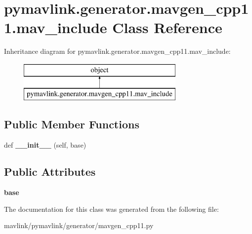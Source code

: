 \hypertarget{classpymavlink_1_1generator_1_1mavgen__cpp11_1_1mav__include}{}\section{pymavlink.\+generator.\+mavgen\+\_\+cpp11.\+mav\+\_\+include Class Reference}
\label{classpymavlink_1_1generator_1_1mavgen__cpp11_1_1mav__include}
Inheritance diagram for pymavlink.\+generator.\+mavgen\+\_\+cpp11.\+mav\+\_\+include\+:\begin{figure}[H]
\begin{center}
\leavevmode
\includegraphics[height=2.000000cm]{classpymavlink_1_1generator_1_1mavgen__cpp11_1_1mav__include}
\end{center}
\end{figure}
\subsection*{Public Member Functions}
\begin{DoxyCompactItemize}
\item 
\mbox{\label{classpymavlink_1_1generator_1_1mavgen__cpp11_1_1mav__include_a927802c78d2a11518f56ec6db923dd70}} 
def {\bfseries \+\_\+\+\_\+init\+\_\+\+\_\+} (self, base)
\end{DoxyCompactItemize}
\subsection*{Public Attributes}
\begin{DoxyCompactItemize}
\item 
\mbox{\label{classpymavlink_1_1generator_1_1mavgen__cpp11_1_1mav__include_ad3e828d0783a3571238a55aef8b94160}} 
{\bfseries base}
\end{DoxyCompactItemize}


The documentation for this class was generated from the following file\+:\begin{DoxyCompactItemize}
\item 
mavlink/pymavlink/generator/mavgen\+\_\+cpp11.\+py\end{DoxyCompactItemize}
